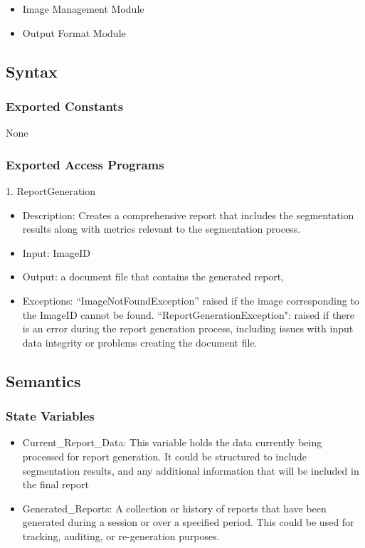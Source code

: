 \documentclass[12pt, titlepage]{article}
\begin{document}
\begin{itemize}
    \item Image Management Module
    \item Output Format Module
\end{itemize}

\subsection{Syntax}

\subsubsection{Exported Constants}
None
\subsubsection{Exported Access Programs}

1. ReportGeneration
\begin{itemize}
    \item Description: Creates a comprehensive report that includes the segmentation results along with metrics relevant to the segmentation process.
    \item Input: ImageID
    \item Output: a document file that contains the generated report,
    \item Exceptions: “ImageNotFoundException” raised if the image corresponding to the ImageID cannot be found. ``ReportGenerationException": raised if there is an error during the report generation process, including issues with input data integrity or problems creating the document file.
\end{itemize}

\subsection{Semantics}

\subsubsection{State Variables}
\begin{itemize}
    \item Current\_Report\_Data: This variable holds the data currently being processed for report generation. It could be structured to include segmentation results, and any additional information that will be included in the final report
    \item Generated\_Reports: A collection or history of reports that have been generated during a session or over a specified period. This could be used for tracking, auditing, or re-generation purposes.
\end{itemize}
\end{document}
